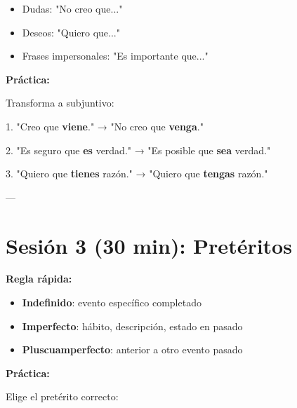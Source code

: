 \documentclass[a4paper,11pt]{article}
\begin{document}
\begin{itemize}

  \item Dudas: "No creo que..."

  \item Deseos: "Quiero que..."

  \item Frases impersonales: "Es importante que..."

\end{itemize}

\vspace{0.2cm}

\textbf{Práctica:}

Transforma a subjuntivo:

1. "Creo que \textbf{viene}." → "No creo que \textbf{venga}."

2. "Es seguro que \textbf{es} verdad." → "Es posible que \textbf{sea} verdad."

3. "Quiero que \textbf{tienes} razón." → "Quiero que \textbf{tengas} razón."

\vspace{0.2cm}

---

\vspace{0.2cm}

\section{Sesión 3 (30 min): Pretéritos}

\vspace{0.2cm}

\textbf{Regla rápida:}

\begin{itemize}

  \item \textbf{Indefinido}: evento específico completado

  \item \textbf{Imperfecto}: hábito, descripción, estado en pasado

  \item \textbf{Pluscuamperfecto}: anterior a otro evento pasado

\end{itemize}

\vspace{0.2cm}

\textbf{Práctica:}

Elige el pretérito correcto:
\end{document}
